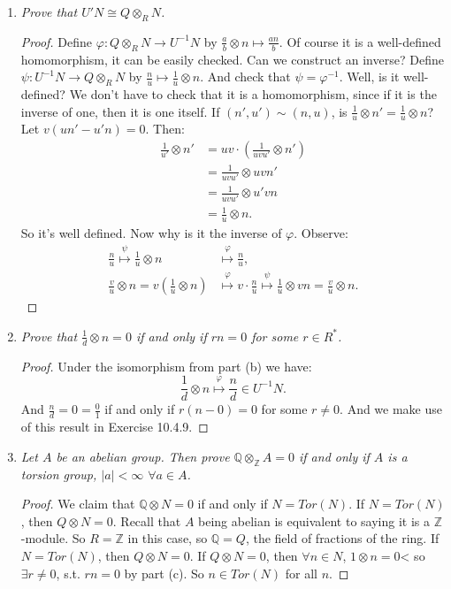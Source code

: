 \documentclass[9pt,reqno,twoside]{amsbook}
\theoremstyle{plain}
\numberwithin{section}{chapter}
\numberwithin{equation}{chapter}
\theoremstyle{definition}
\theoremstyle{remark}
\theoremstyle{plain}
\newcommand{\z}{\mathbb{Z}}
\newcommand{\Q}{\mathbb{Q}}
\newcommand{\bee}{\begin{equation}\begin{aligned}}
\newcommand{\eee}{\end{aligned}\end{equation}}
\newcommand{\fracc}{\frac}
\newcommand{\tens}{\otimes}
\renewcommand{\phi}{\varphi}
\begin{document}
\begin{enumerate}[label=\arabic*.]
\begin{enumerate}
\item \textit{Prove that $U'N \cong Q \tens_R N$. }

\begin{proof}
Define $\phi: Q \tens_R N \to U^{-1}N$ by $\fracc{a}{b}\tens n \mapsto \fracc{an}{b}$. Of course it is a well-defined homomorphism, it can be easily checked. Can we construct an inverse? Define $\psi: U^{-1}N \to Q \tens_R N$ by $\fracc{n}{u} \mapsto \fracc{1}{u}\tens n$. And check that $\psi = \phi^{-1}$. Well, is it well-defined? We don't have to check that it is a homomorphism, since if it is the inverse of one, then it is one itself. If $(n',u') \sim (n,u)$, is $\fracc{1}{u}\tens n' = \fracc{1}{u}\tens n$? Let $v(un' - u'n) = 0$. Then:
\bee
\fracc{1}{u'}\tens n' &= uv \cdot \left(\fracc{1}{uvu'}\tens n' \right)\\
&= \fracc{1}{uvu'}\tens uvn'\\
&= \fracc{1}{uvu'}\tens u'vn\\
&= \fracc{1}{u}\tens n.
\eee
So it's well defined. Now why is it the inverse of $\phi$. Observe: 
\bee
\fracc{n}{u}\overset{\psi}{\mapsto} \fracc{1}{u}\tens n &\overset{\phi}{\mapsto} \fracc{n}{u},\\
\fracc{v}{u}\tens n = v(\fracc{1}{u}\tens n) &\overset{\phi}{\mapsto}
v \cdot \fracc{n}{u}\overset{\psi}{\mapsto} \fracc{1}{u}\tens vn = \fracc{v}{u}\tens n.
\eee
\end{proof}

\item \textit{Prove that $\fracc{1}{d}\tens n = 0$ if and only if $rn = 0$ for some $r \in R^*$. }

\begin{proof}
Under the isomorphism from part (b) we have:
$$
\fracc{1}{d}\tens n \overset{\phi}{\mapsto} \fracc{n}{d}\in U^{-1}N.
$$
And $\fracc{n}{d} = 0 = \fracc{0}{1}$ if and only if $r(n - 0) = 0$ for some $r \neq 0$. And we make use of this result in Exercise 10.4.9. 
\end{proof}

\item \textit{Let $A$ be an abelian group. Then prove $\Q \tens_\z A = 0$ if and only if $A$ is a torsion group, $|a| < \infty$ $\forall a \in A$. }

\begin{proof}
We claim that $\Q \tens N = 0$ if and only if $N = Tor(N)$. If $N = Tor(N)$, then $Q \tens N = 0$. Recall that $A$ being abelian is equivalent to saying it is a $\z$-module. So $R = \z$ in this case, so $\Q = Q$, the field of fractions of the ring. If $N = Tor(N)$, then $Q \tens N =0$. If $Q \tens N = 0$, then $\forall n \in N$, $1 \tens n = 0$< so $\exists r \neq 0$, s.t. $rn = 0$ by part (c). So $n \in Tor(N)$ for all $n$. 
\end{proof}


\end{enumerate}
\end{enumerate}
\end{document}
